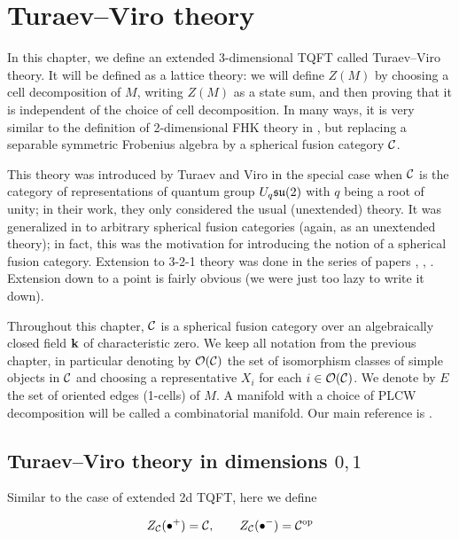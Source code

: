 \chapter{Turaev--Viro theory}\label{c:TV}



In this chapter, we define an extended 3-dimensional TQFT called
Turaev--Viro theory. It will be defined as a lattice theory: we will define
$Z(M)$ by choosing a cell decomposition of $M$, writing $Z(M)$ as a state
sum, and then proving that it is independent of the choice of cell
decomposition. In many ways, it is very similar to the definition of
2-dimensional FHK theory in , but replacing a separable
symmetric Frobenius algebra by a spherical fusion category $\mathcal{C}$.

This theory was introduced by Turaev and Viro \cite{turaev-viro} in the
special case  when $\mathcal{C}$ is the category of representations of quantum
group $U_q\mathfrak{su}(2)$ with $q$ being a root of unity; in their work, they only
considered the usual (unextended) theory. It was generalized in
\cite{barrett} to arbitrary spherical fusion categories (again, as an
unextended theory); in fact, this was the motivation for introducing the
notion of a spherical fusion category. Extension to 3-2-1 theory was done 
in the series of papers \cite{balsam-kirillov}, 
\cite{balsam-TV2}, \cite{balsam-TV3}. 
Extension down to a point is fairly obvious (we were just too lazy to write 
it down).

Throughout this chapter, $\mathcal{C}$ is a spherical fusion category over an
algebraically closed field $\mathbf{k}$ of characteristic zero. We keep all
notation from the previous chapter, in particular denoting by $\mathcal{O}(\mathcal{C})$ the set
of isomorphism classes of simple objects in $\mathcal{C}$ and choosing a
representative $X_i$ for each $i\in \mathcal{O}(\mathcal{C})$. We denote by $E$ the set of oriented
 edges (1-cells) of $M$. A manifold with a choice of PLCW decomposition will be 
 called a combinatorial manifold. Our main reference is \cite{balsam-kirillov}.



\section{Turaev--Viro theory in dimensions $0,1$}\label{s:tv-dim01}

Similar to the case of extended 2d TQFT, here we define

$$
Z_{\mathcal{C}}(\bullet^+)=\mathcal{C}, \qquad
Z_{\mathcal{C}}(\bullet^-)=\mathcal{C}^{\mathrm{op}}
$$

